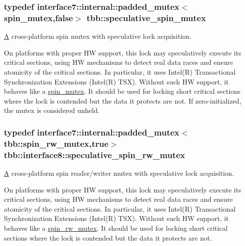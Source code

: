 \subsubsection[{speculative\+\_\+spin\+\_\+mutex}]{\setlength{\rightskip}{0pt plus 5cm}typedef interface7\+::internal\+::padded\+\_\+mutex$<$spin\+\_\+mutex,false$>$ {\bf tbb\+::speculative\+\_\+spin\+\_\+mutex}}\label{group__synchronization_gaaa37cbd66059817a12393e6ff53ae3be}


\hyperlink{structA}{A} cross-\/platform spin mutex with speculative lock acquisition. 

On platforms with proper H\+W support, this lock may speculatively execute its critical sections, using H\+W mechanisms to detect real data races and ensure atomicity of the critical sections. In particular, it uses Intel(\+R) Transactional Synchronization Extensions (Intel(\+R) T\+S\+X). Without such H\+W support, it behaves like a \hyperlink{classtbb_1_1spin__mutex}{spin\+\_\+mutex}. It should be used for locking short critical sections where the lock is contended but the data it protects are not. If zero-\/initialized, the mutex is considered unheld. \hypertarget{group__synchronization_ga802372513021fc3ba3741c387b294987}{}
\subsubsection[{speculative\+\_\+spin\+\_\+rw\+\_\+mutex}]{\setlength{\rightskip}{0pt plus 5cm}typedef interface7\+::internal\+::padded\+\_\+mutex$<${\bf tbb\+::spin\+\_\+rw\+\_\+mutex},true$>$ {\bf tbb\+::interface8\+::speculative\+\_\+spin\+\_\+rw\+\_\+mutex}}\label{group__synchronization_ga802372513021fc3ba3741c387b294987}


\hyperlink{structA}{A} cross-\/platform spin reader/writer mutex with speculative lock acquisition. 

On platforms with proper H\+W support, this lock may speculatively execute its critical sections, using H\+W mechanisms to detect real data races and ensure atomicity of the critical sections. In particular, it uses Intel(\+R) Transactional Synchronization Extensions (Intel(\+R) T\+S\+X). Without such H\+W support, it behaves like a \hyperlink{classtbb_1_1spin__rw__mutex}{spin\+\_\+rw\+\_\+mutex}. It should be used for locking short critical sections where the lock is contended but the data it protects are not. 